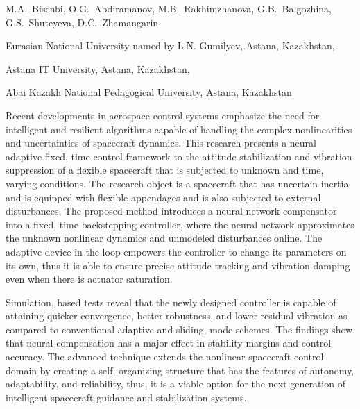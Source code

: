 
\begin{header}

M.A.~Bisenbi,
O.G.~Abdiramanov\envelope,
M.B.~Rakhimzhanova,
G.B.~Balgozhina,
G.S.~Shuteyeva,
D.C.~Zhamangarin
\end{header}

\begin{affil}
Eurasian National University named by L.N. Gumilyev, Astana, Kazakhstan,

Astana IT University, Astana, Kazakhstan,

Abai Kazakh National Pedagogical University, Astana, Kazakhstan

\end{affil}

Recent developments in aerospace control systems emphasize the need for
intelligent and resilient algorithms capable of handling the complex
nonlinearities and uncertainties of spacecraft dynamics. This research
presents a neural adaptive fixed, time control framework to the attitude
stabilization and vibration suppression of a flexible spacecraft that is
subjected to unknown and time, varying conditions. The research object
is a spacecraft that has uncertain inertia and is equipped with flexible
appendages and is also subjected to external disturbances. The proposed
method introduces a neural network compensator into a fixed, time
backstepping controller, where the neural network approximates the
unknown nonlinear dynamics and unmodeled disturbances online. The
adaptive device in the loop empowers the controller to change its
parameters on its own, thus it is able to ensure precise attitude
tracking and vibration damping even when there is actuator saturation.

Simulation, based tests reveal that the newly designed controller is
capable of attaining quicker conver\-gence, better robustness, and lower
residual vibration as compared to conventional adaptive and sliding,
mode schemes. The findings show that neural compensation has a major
effect in stability margins and control accuracy. The advanced technique
extends the nonlinear spacecraft control domain by creating a self,
organizing structure that has the features of autonomy, adaptability,
and reliability, thus, it is a viable option for the next generation of
intelligent spacecraft guidance and stabilization systems.

